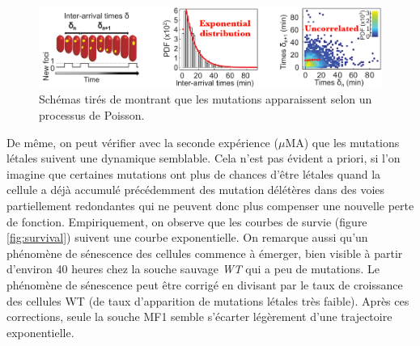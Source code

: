\documentclass[12pt]{article}
\begin{document}
\begin{figure}[h]
  \begin{center}
    \vspace{3mm}
    \includegraphics[scale=0.45]{../Img/Interarrival_times.png}
  \end{center}  
  \caption{\label{fig:iatime}Schémas tirés de \cite{rob} montrant que les mutations apparaissent selon un processus de Poisson.}
\end{figure}
\FloatBarrier

De même, on peut vérifier avec la seconde expérience ($\mu$MA) que les mutations létales suivent une dynamique semblable. Cela n'est pas évident a priori, si l'on imagine que certaines mutations ont plus de chances d'être létales quand la cellule a déjà accumulé précédemment des mutation délétères dans des voies partiellement redondantes qui ne peuvent donc plus compenser une nouvelle perte de fonction. Empiriquement, on observe que les courbes de survie (figure \ref{fig:survival}) suivent une courbe exponentielle. On remarque aussi qu'un phénomène de sénescence des cellules commence à émerger, bien visible à partir d'environ 40 heures chez la souche sauvage \emph{WT} qui a peu de mutations. Le phénomène de sénescence peut être corrigé en divisant par le taux de croissance des cellules WT (de taux d'apparition de mutations létales très faible). Après ces corrections, seule la souche MF1 semble s'écarter légèrement d'une trajectoire exponentielle.
\end{document}
